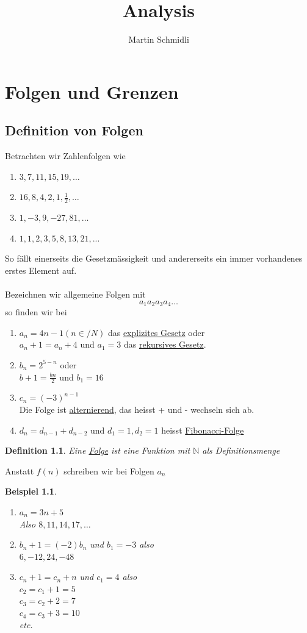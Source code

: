 \documentclass{report}
\title{Analysis}
\author{Martin Schmidli}
\newtheorem{mydef}{Definition}
\newtheorem{myexample}{Beispiel}
\newcommand{\N}{{\mathbb N}}
\begin{document}
\maketitle
\chapter{Folgen und Grenzen}
\section{Definition von Folgen}
Betrachten wir Zahlenfolgen wie
\begin{enumerate}
\item $3, 7, 11, 15, 19, \ldots$
\item $16, 8, 4, 2, 1 , \frac{1}{2}, \ldots$
\item $1, -3, 9, -27, 81,\ldots$
\item $1, 1, 2, 3, 5, 8, 13, 21, ...$
\end{enumerate}
So fällt einerseits die Gesetzmässigkeit und andererseits ein immer vorhandenes erstes Element auf.\\
\\
Bezeichnen wir allgemeine Folgen mit
\begin{equation*}a_1 a_2 a_3 a_4 \ldots\end{equation*}
so finden wir bei
\begin{enumerate}
\item
$a_n = 4n -1 (n\in /N)$ das \underline{explizites Gesetz} oder\\
$a_n + 1 = a_n + 4$ und $a_1 = 3$ das \underline{rekursives Gesetz}.
\item
$b_n = 2^{5-n}$ oder \\
$b+1 = \frac{bn}{2}$ und $b_1 = 16$
\item
$c_n = (-3)^{n-1}$\\
Die Folge ist \underline{alternierend}, das heisst + und - wechseln sich ab. 
\item
$d_n = d_{n-1}+ d_{n-2}$ und $d_1 = 1, d_2 = 1$
heisst \underline{Fibonacci-Folge}
\end{enumerate}
\newpage
\begin{mydef}Eine \underline{Folge} ist eine Funktion mit $\N$ als Definitionsmenge\end{mydef}
Anstatt $f(n)$ schreiben wir bei Folgen $a_n$
\begin{myexample}
	\begin{enumerate}
		\item
		$a_n = 3n + 5$\\ 
		Also $8, 11, 14,17, \ldots$
		\item
		$b_n+1 = (-2)b_n$ und $b_1 = -3$ also\\
		$6, -12, 24, -48$
		\item
		$c_n + 1 = c_n + n$ und $c_1 = 4$ also\\
		$c_2 = c_1 + 1 = 5$\\
		$c_3 = c_2 + 2 = 7$\\
		$c_4 = c_3 + 3 = 10$\\
		etc.
	\end{enumerate}
\end{myexample}
\newpage
\end{document}
